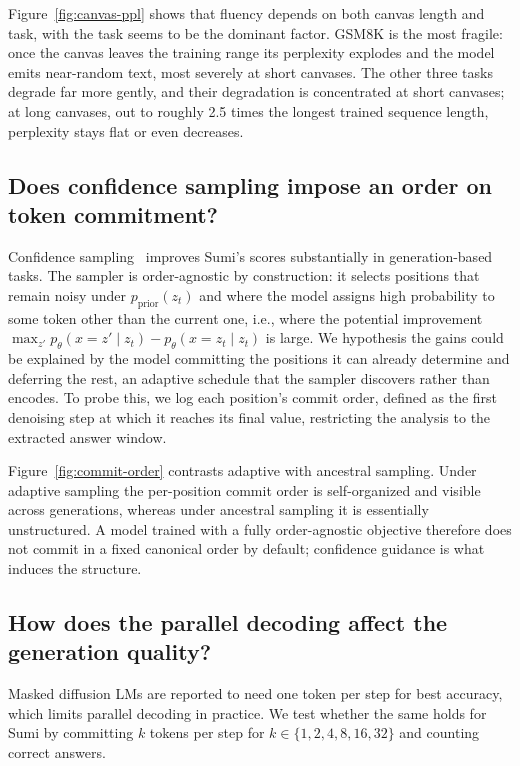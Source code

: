 \documentclass[11pt, a4paper]{style}
\begin{document}
Figure~\ref{fig:canvas-ppl} shows that fluency depends on both canvas length and task, with the task seems to be the dominant factor. GSM8K is the most fragile: once the canvas leaves the training range its perplexity explodes and the model emits near-random text, most severely at short canvases. The other three tasks degrade far more gently, and their degradation is concentrated at short canvases; 
at long canvases, out to roughly 2.5 times the longest trained sequence length, perplexity stays flat or even decreases.

\subsection{Does confidence sampling impose an order on token commitment?}
Confidence sampling~\citep{rutte2026scaling} improves Sumi's scores substantially in generation-based tasks.
The sampler is order-agnostic by construction: it selects positions that remain noisy under $p_{\mathrm{prior}}(z_t)$ and where the model assigns high probability to some token other than the current one, i.e., where the potential improvement
$\max_{z'} p_\theta(x = z' \mid z_t) - p_\theta(x = z_t \mid z_t)$ is large. 
We hypothesis the gains could be explained by the model committing the positions it can already determine and deferring the rest, an adaptive schedule that the sampler discovers rather than encodes. 
To probe this, we log each position's commit order, defined as the first denoising step at which it reaches its final value, restricting the analysis to the extracted answer window.

Figure~\ref{fig:commit-order} contrasts adaptive with ancestral sampling. Under adaptive sampling the per-position commit order is self-organized and visible across generations, whereas under ancestral sampling it is essentially unstructured. A model trained with a fully order-agnostic objective therefore does not commit in a fixed canonical order by default; confidence guidance is what induces the structure. 



\subsection{How does the parallel decoding affect the generation quality?}
Masked diffusion LMs are reported to need one token per step for best accuracy, which limits parallel decoding in practice. We test whether the same holds for Sumi by committing $k$ tokens per step for $k \in \{1, 2, 4, 8, 16, 32\}$ and counting correct answers. 
\end{document}
